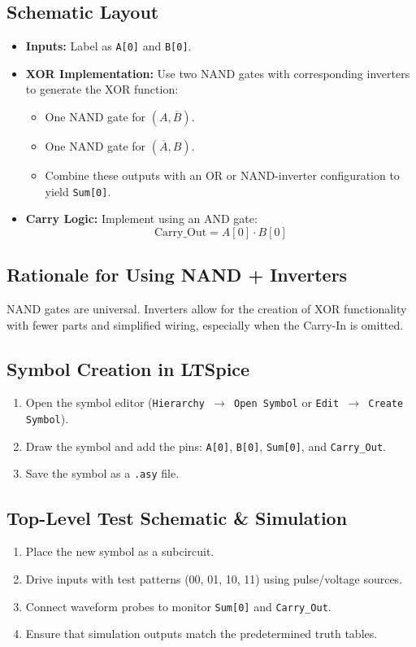 \documentclass[12pt]{article}
\begin{document}
\subsection{Schematic Layout}
\begin{itemize}
    \item \textbf{Inputs:} Label as \texttt{A[0]} and \texttt{B[0]}.
    \item \textbf{XOR Implementation:} Use two NAND gates with corresponding inverters to generate the XOR function:
    \begin{itemize}
        \item One NAND gate for \((A, \overline{B})\).
        \item One NAND gate for \((\overline{A}, B)\).
        \item Combine these outputs with an OR or NAND-inverter configuration to yield \texttt{Sum[0]}.
    \end{itemize}
    \item \textbf{Carry Logic:} Implement using an AND gate:
    \[
    \text{Carry\_Out} = A[0] \cdot B[0]
    \]
\end{itemize}

\subsection{Rationale for Using NAND + Inverters}
NAND gates are universal. Inverters allow for the creation of XOR functionality with fewer parts and simplified wiring, especially when the Carry-In is omitted.

\subsection{Symbol Creation in LTSpice}
\begin{enumerate}
    \item Open the symbol editor (\texttt{Hierarchy $\rightarrow$ Open Symbol} or \texttt{Edit $\rightarrow$ Create Symbol}).
    \item Draw the symbol and add the pins: \texttt{A[0]}, \texttt{B[0]}, \texttt{Sum[0]}, and \texttt{Carry\_Out}.
    \item Save the symbol as a \texttt{.asy} file.
\end{enumerate}

\subsection{Top-Level Test Schematic \& Simulation}
\begin{enumerate}
    \item Place the new symbol as a subcircuit.
    \item Drive inputs with test patterns (00, 01, 10, 11) using pulse/voltage sources.
    \item Connect waveform probes to monitor \texttt{Sum[0]} and \texttt{Carry\_Out}.
    \item Ensure that simulation outputs match the predetermined truth tables.
\end{enumerate}
\end{document}
